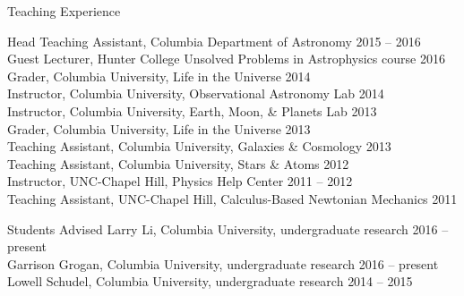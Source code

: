\documentclass{resume_clark} %
\begin{document}

\begin{rSection}{Teaching Experience}

Head Teaching Assistant, Columbia Department of Astronomy \hfill {2015 -- 2016}\\
Guest Lecturer, Hunter College Unsolved Problems in Astrophysics course \hfill {2016} \\
Grader, Columbia University, Life in the Universe \hfill {2014}\\
Instructor, Columbia University, Observational Astronomy Lab \hfill {2014}\\
Instructor, Columbia University, Earth, Moon, \& Planets Lab \hfill {2013}\\
Grader, Columbia University, Life in the Universe \hfill {2013}\\
Teaching Assistant, Columbia University, Galaxies \& Cosmology \hfill {2013}\\
Teaching Assistant, Columbia University, Stars \& Atoms \hfill {2012}\\
Instructor, UNC-Chapel Hill, Physics Help Center \hfill {2011 -- 2012}\\
Teaching Assistant, UNC-Chapel Hill, Calculus-Based Newtonian Mechanics \hfill {2011}\\

\end{rSection}


\begin{rSection}{Students Advised}
Larry Li, Columbia University, undergraduate research \hfill{2016 -- present}\\
Garrison Grogan, Columbia University, undergraduate research \hfill{2016 -- present}\\
Lowell Schudel, Columbia University, undergraduate research \hfill{2014 -- 2015}\\
\end{rSection}

\end{document}
